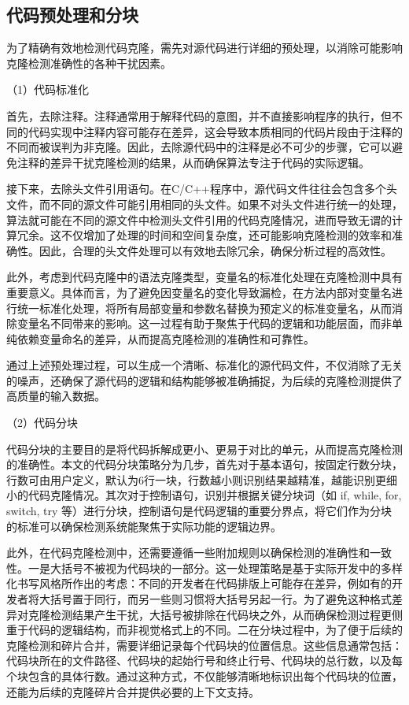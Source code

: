 \subsection{代码预处理和分块}

为了精确有效地检测代码克隆，需先对源代码进行详细的预处理，以消除可能影响克隆检测准确性的各种干扰因素。

（1）代码标准化

首先，去除注释。注释通常用于解释代码的意图，并不直接影响程序的执行，但不同的代码实现中注释内容可能存在差异，这会导致本质相同的代码片段由于注释的不同而被误判为非克隆。因此，去除源代码中的注释是必不可少的步骤，它可以避免注释的差异干扰克隆检测的结果，从而确保算法专注于代码的实际逻辑。

接下来，去除头文件引用语句。在C/C++程序中，源代码文件往往会包含多个头文件，而不同的源文件可能引用相同的头文件。如果不对头文件进行统一的处理，算法就可能在不同的源文件中检测头文件引用的代码克隆情况，进而导致无谓的计算冗余。这不仅增加了处理的时间和空间复杂度，还可能影响克隆检测的效率和准确性。因此，合理的头文件处理可以有效地去除冗余，确保分析过程的高效性。

此外，考虑到代码克隆中的语法克隆类型，变量名的标准化处理在克隆检测中具有重要意义。具体而言，为了避免因变量名的变化导致漏检，在方法内部对变量名进行统一标准化处理，将所有局部变量和参数名替换为预定义的标准变量名，从而消除变量名不同带来的影响。这一过程有助于聚焦于代码的逻辑和功能层面，而非单纯依赖变量命名的差异，从而提高克隆检测的准确性和可靠性。

通过上述预处理过程，可以生成一个清晰、标准化的源代码文件，不仅消除了无关的噪声，还确保了源代码的逻辑和结构能够被准确捕捉，为后续的克隆检测提供了高质量的输入数据。

（2）代码分块

代码分块的主要目的是将代码拆解成更小、更易于对比的单元，从而提高克隆检测的准确性。本文的代码分块策略分为几步，首先对于基本语句，按固定行数分块，行数可由用户定义，默认为6行一块，行数越小则识别结果越精准，越能识别更细小的代码克隆情况。其次对于控制语句，识别并根据关键分块词（如 if, while, for, switch, try 等）进行分块，控制语句是代码逻辑的重要分界点，将它们作为分块的标准可以确保检测系统能聚焦于实际功能的逻辑边界。

此外，在代码克隆检测中，还需要遵循一些附加规则以确保检测的准确性和一致性。一是大括号不被视为代码块的一部分。这一处理策略是基于实际开发中的多样化书写风格所作出的考虑：不同的开发者在代码排版上可能存在差异，例如有的开发者将大括号置于同行，而另一些则习惯将大括号另起一行。为了避免这种格式差异对克隆检测结果产生干扰，大括号被排除在代码块之外，从而确保检测过程更侧重于代码的逻辑结构，而非视觉格式上的不同。二在分块过程中，为了便于后续的克隆检测和碎片合并，需要详细记录每个代码块的位置信息。这些信息通常包括：代码块所在的文件路径、代码块的起始行号和终止行号、代码块的总行数，以及每个块包含的具体行数。通过这种方式，不仅能够清晰地标识出每个代码块的位置，还能为后续的克隆碎片合并提供必要的上下文支持。

